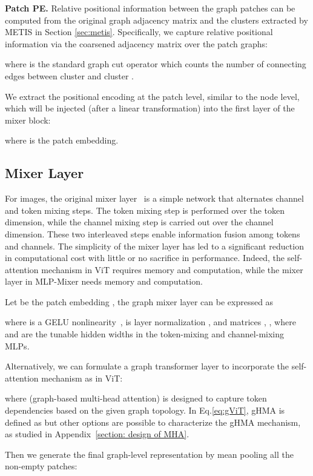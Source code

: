 \documentclass{article}
\begin{document}
\textbf{Patch PE.} Relative positional information between the graph patches can be computed from the original graph adjacency matrix  and the clusters  extracted by METIS in Section \ref{sec:metis}. Specifically, we capture relative positional information via the coarsened adjacency matrix  over the patch graphs: 


where  is the standard graph cut operator which counts the number of connecting edges between cluster  and cluster . 


We extract the positional encoding  at the patch level, similar to the node level, which will be injected (after a linear transformation) into the first layer of the mixer block:

where  is the patch embedding.



\subsection{Mixer Layer}\label{subsec: mixer layer}
For images, the original mixer layer~\citep{tolstikhin2021mlp} is a simple network that alternates channel and token mixing steps. The token mixing step is performed over the token dimension, while the channel mixing step is carried out over the channel dimension. These two interleaved steps enable information fusion among tokens and channels. 
The simplicity of the mixer layer has led to a significant reduction in computational cost with little or no sacrifice in performance. Indeed, the self-attention mechanism in ViT requires  memory and  computation, while the mixer layer in MLP-Mixer needs  memory and  computation. 

Let  be the patch embedding , the graph mixer layer can be expressed as 

where  is a GELU nonlinearity~\citep{hendrycks2016gaussian},  is layer normalization  \citep{ba2016layer}, and matrices , , where  and  are the tunable hidden widths in the token-mixing and channel-mixing MLPs.

Alternatively, we can formulate a graph transformer layer to incorporate the self-attention mechanism as in ViT:

where  (graph-based multi-head attention) is designed to capture token dependencies based on the given graph topology. In Eq.\eqref{eq:gViT}, gHMA is defined as  but other options are possible to characterize the gHMA mechanism, as studied in Appendix~\ref{section: design of MHA}. 


Then we generate the final graph-level representation by mean pooling all the non-empty patches:
\end{document}

